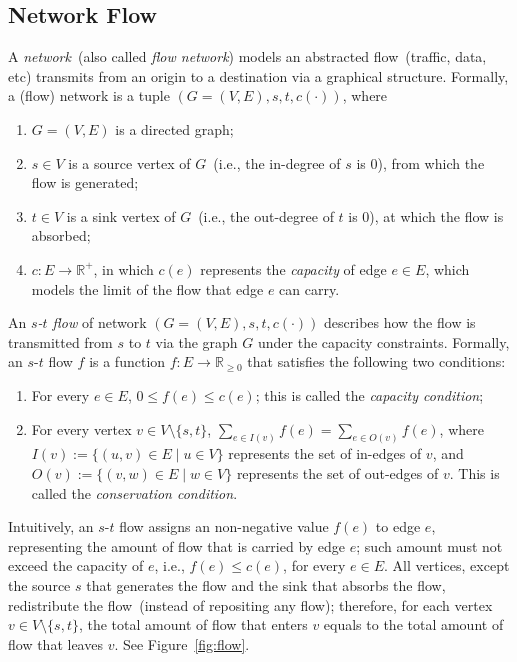 \subsection*{Network Flow}

A \emph{network}~(also called \emph{flow network}) models 
an abstracted flow~(traffic, data, etc) transmits from an origin to a destination
via a graphical structure. Formally, a (flow) network is a tuple $(G = (V, E), s, t, c(\cdot))$, where

\begin{enumerate}
\item $G = (V, E)$ is a directed graph;
\item $s\in V$ is a source vertex of $G$~(i.e., the in-degree of $s$ is 0), from which the flow is generated;
\item $t\in V$ is a sink vertex of $G$~(i.e., the out-degree of $t$ is 0), at which the flow is absorbed;
\item $c: E\to \mathbb{R}^+$, in which $c(e)$ represents the \emph{capacity} of edge $e\in E$, which models the limit of the flow that edge $e$ can carry.
\end{enumerate}

An \emph{$s$-$t$ flow} of network $(G = (V, E), s, t, c(\cdot))$
describes {how} the flow is transmitted from $s$ to $t$
via the graph $G$ under the capacity constraints. Formally,
an $s$-$t$ flow $f$ is a function $f: E\to \mathbb{R}_{\ge 0}$
that satisfies the following two conditions:
\begin{enumerate}
\item For every $e\in E$, $0\le f(e) \le c(e)$; this is called the \emph{capacity condition};
\item For every vertex $v\in V\setminus\{s,t\}$, $\sum_{e\in I(v)} f(e) = \sum_{e\in O(v)} f(e)$, where $I(v) := \{(u,v)\in E\mid u\in V\}$ represents
the set of in-edges of $v$, and $O(v) := \{(v,w)\in E\mid w\in V\}$ represents
the set of out-edges of $v$. This is called the \emph{conservation condition}.
\end{enumerate}

Intuitively, an $s$-$t$ flow assigns an non-negative value $f(e)$ to edge $e$, representing the
amount of flow that is carried by edge $e$; such amount must not exceed the capacity of $e$, i.e., $f(e) \le c(e)$, for every $e\in E$.
All vertices, except the source $s$ that generates the flow and the sink that absorbs the flow,
redistribute the flow~(instead of repositing any flow); therefore, for each vertex $v\in V\setminus\{s,t\}$,
the total amount of flow that enters $v$ equals to the total amount of flow that leaves $v$.
See Figure~\ref{fig:flow}.

